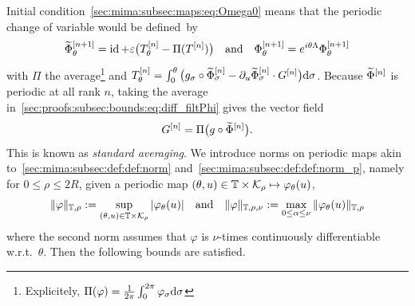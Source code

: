 Initial condition~\eqref{sec:mima:subsec:maps:eq:Omega0} means that
the periodic change of variable would be defined~by
\begin{equation} \label{sec:proofs:subsec:bounds:eq:def_Phi}
  \widetilde{\Phi}^{[n+1]}_{\theta} 
  = \operatorname{id} + \varepsilon \big( T^{[n]}_{\theta} - \Pi(T^{[n]}) \big)
  \quad\text{and}\quad
  \Phi^{[n+1]}_{\theta} = e^{i\theta\Lambda} \Phi^{[n+1]}_{\theta}
\end{equation}
with $\Pi$ the average\footnote{
  Explicitely, $\Pi(\varphi) = \frac{1}{2\pi} \int_0^{2\pi}
  \varphi_{\sigma} \mathrm{d}\sigma$
} and $T^{[n]}_{\theta} = \int_0^{\theta} \big( g_{\sigma} \circ 
\widetilde{\Phi}^{[n]}_{\sigma} - \partial_{u} \widetilde{\Phi}^{[n]}_{\sigma} \cdot G^{[n]} \big) 
\mathrm{d}\sigma$. 
%
Because $\widetilde{\Phi}^{[n]}$ is periodic at all rank $n$, taking the average
in~\eqref{sec:proofs:subsec:bounds:eq:diff_filtPhi} gives the vector field
\begin{equation} \label{sec:proofs:subsec:bounds:eq:def_G}
  G^{[n]} = \Pi \big( g \circ \widetilde{\Phi}^{[n]} \big) .
\end{equation}
This is known as \textit{standard averaging}. 
%
We introduce norms on periodic maps akin
to~\eqref{sec:mima:subsec:def:def:norm}
and~\eqref{sec:mima:subsec:def:def:norm_p}, namely for $0 \leq \rho \leq
2R$, given a periodic map $(\theta, u) \in \mathbb{T} \times \mathcal{K}_{\rho} \mapsto
\varphi_{\theta}(u)$, 
\begin{equation} \label{sec:proofs:subsec:bounds:eq:def_norm}
  \| \varphi \|_{\mathbb{T}, \rho} := \sup_{(\theta, u) \in \mathbb{T} \times \mathcal{K}_{\rho}}
  | \varphi_{\theta}(u) |
  \quad\text{and}\quad
  \| \varphi \|_{\mathbb{T}, \rho, \nu} := \max_{0 \leq \alpha \leq \nu}
  \| \varphi_{\theta}(u) \|_{\mathbb{T}, \rho}
\end{equation} 
where the second norm assumes that $\varphi$ is $\nu$-times continuously
differentiable w.r.t.~$\theta$. Then the following bounds are satisfied.

